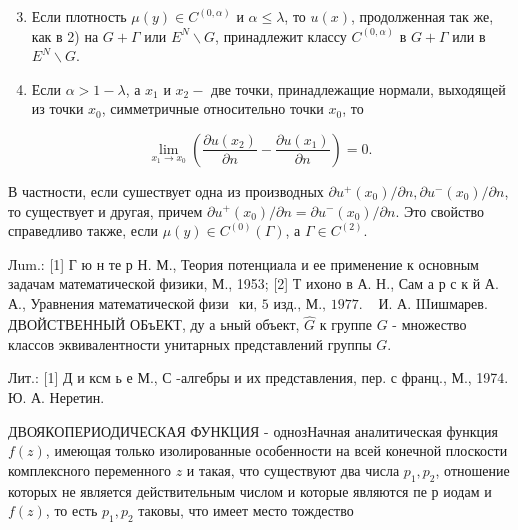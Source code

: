 \documentclass[10pt]{article}
\begin{document}
\begin{enumerate}

  \setcounter{enumi}{2}

  \item Если плотность $\mu(y) \in C^{(0, \alpha)}$ и $\alpha \leqslant \lambda$, то $u(x)$, продолженная так же, как в 2) на $G+\Gamma$ или $E^{N} \backslash G$, принадлежит классу $C^{(0, \alpha)}$ в $G+\Gamma$ или в $E^{N} \backslash G$.



  \item Если $\alpha>1-\lambda$, а $x_{1}$ и $x_{2}-$ две точки, принадлежащие нормали, выходящей из точки $x_{0}$, симметричные относительно точки $x_{0}$, то



\end{enumerate}



\[

\lim _{x_{1} \rightarrow x_{0}}\left(\frac{\partial u\left(x_{2}\right)}{\partial n}-\frac{\partial u\left(x_{1}\right)}{\partial n}\right)=0 .

\]



В частности, если сушествует одна из производных $\partial u^{+}\left(x_{0}\right) / \partial n, \partial u^{-}\left(x_{0}\right) / \partial n$, то существует и другая, причем $\partial u^{+}\left(x_{0}\right) / \partial n=\partial u^{-}\left(x_{0}\right) / \partial n$. Это свойство справедливо также, если $\mu(y) \in C^{(0)}(\Gamma)$, а $\Gamma \in C^{(2)}$.



Лum.: [1] Г ю н те р Н. М., Теория потенциала и ее применение к основным задачам математической физики, М., 1953; [2] Т ихоно в А. Н., Сам а р с к й А. А., Уравнения математической физи$\begin{array}{ll}\text { ки, } 5 \text { изд., М., } 1977 . & \text { И. А. IIIишмарев. }\end{array}$ ДВОЙСТВЕННЫЙ ОБъЕКТ, ду а ьный объект, $\hat{G}$ к группе $G$ - множество классов эквивалентности унитарных представлений группы $G$.



Лит.: [1] Д и ксм ь е М., С -алгебры и их представления, пер. с франц., М., 1974. Ю. А. Неретин.



ДВОЯКОПЕРИОДИЧЕСКАЯ ФУНКЦИЯ - однозНачная аналитическая функция $f(z)$, имеющая только изолированные особенности на всей конечной плоскости комплексного переменного $z$ и такая, что существуют два числа $p_{1}, p_{2}$, отношение которых не является действительным числом и которые являются пе р иодам и $f(z)$, то есть $p_{1}, p_{2}$ таковы, что имеет место тождество
\end{document}
